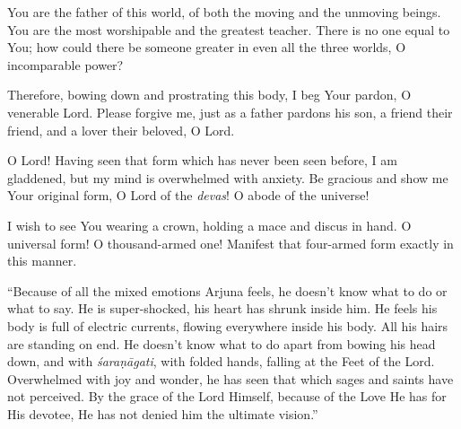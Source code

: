 {You are the father of this world, of both the moving and the unmoving beings. You are the most worshipable and the greatest teacher. There is no one equal to You; how could there be someone greater in even all the three worlds, O incomparable power?}

{Therefore, bowing down and prostrating this body, I beg Your pardon, O venerable Lord. Please forgive me, just as a father pardons his son, a friend their friend, and a lover their beloved, O Lord.}

{O Lord! Having seen that form which has never been seen before, I am gladdened, but my mind is overwhelmed with anxiety. Be gracious and show me Your original form, O Lord of the \textit{devas}! O abode of the universe!}

{I wish to see You wearing a crown, holding a mace and discus in hand. O universal form! O thousand-armed one! Manifest that four-armed form exactly in this manner.}

\enquote{Because of all the mixed emotions Arjuna feels, he doesn’t know what to do or what to say. He is super-shocked, his heart has shrunk inside him. He feels his body is full of electric currents, flowing everywhere inside his body. All his hairs are standing on end. He doesn’t know what to do apart from bowing his head down, and with \textit{śaraṇāgati}, with folded hands, falling at the Feet of the Lord. Overwhelmed with joy and wonder, he has seen that which sages and saints have not perceived. By the grace of the Lord Himself, because of the Love He has for His devotee, He has not denied him the ultimate vision.}

